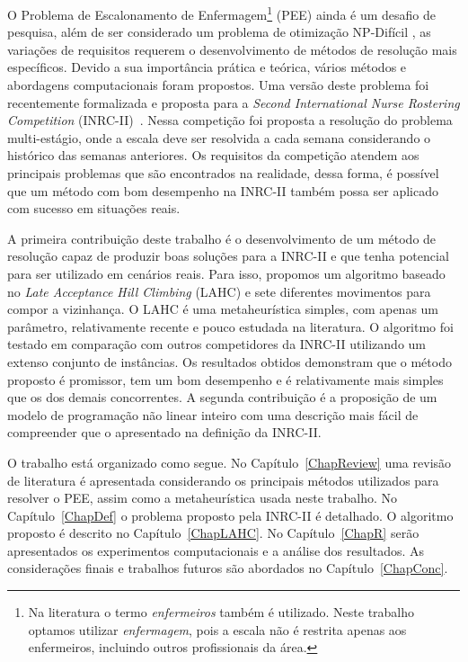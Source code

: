 \documentclass[cic,tc, twoside]{iiufrgs}
\begin{document}
O Problema de Escalonamento de Enfermagem\footnote{Na literatura o termo \emph{enfermeiros} também é utilizado. Neste trabalho optamos utilizar \emph{enfermagem}, pois a escala não é restrita apenas aos enfermeiros, incluindo outros profissionais da área.} (PEE) ainda é um desafio de pesquisa, além de ser considerado um problema de otimização NP-Difícil \cite{osogami2000classification}, as variações de requisitos requerem o desenvolvimento de métodos de resolução mais específicos. Devido a sua importância prática e teórica, vários métodos e abordagens computacionais foram propostos. Uma versão deste problema foi recentemente formalizada e proposta para a \textit{Second International Nurse Rostering Competition} (INRC-II)~\cite{ceschia2015second}. Nessa competição foi proposta a resolução do problema multi-estágio, onde a escala deve ser resolvida a cada semana considerando o histórico das semanas anteriores. Os requisitos da competição atendem aos principais problemas que são encontrados na realidade, dessa forma, é possível que um método com bom desempenho na INRC-II também possa ser aplicado com sucesso em situações reais. 

A primeira contribuição deste trabalho é o desenvolvimento de um método de resolução capaz de produzir boas soluções para a INRC-II e que tenha potencial para ser utilizado em cenários reais. Para isso, propomos um algoritmo baseado no \textit{Late Acceptance Hill Climbing} (LAHC) e sete diferentes movimentos para compor a vizinhança. O LAHC é uma metaheurística simples, com apenas um parâmetro, relativamente recente e pouco estudada na literatura. O algoritmo foi testado em comparação com outros competidores da INRC-II utilizando um extenso conjunto de instâncias. Os resultados obtidos demonstram que o método proposto é promissor, tem um bom desempenho e é relativamente mais simples que os dos demais concorrentes. A segunda contribuição é a proposição de um modelo de programação não linear inteiro com uma descrição mais fácil de compreender que o apresentado na definição da INRC-II.

O trabalho está organizado como segue. No Capítulo~\ref{ChapReview} uma revisão de literatura é apresentada considerando os principais
métodos utilizados para resolver o PEE, assim como a metaheurística usada 
neste trabalho. No Capítulo~\ref{ChapDef} o problema proposto pela INRC-II é detalhado. O algoritmo proposto é descrito no 
Capítulo~\ref{ChapLAHC}. No Capítulo~\ref{ChapR} serão apresentados os experimentos computacionais e a análise dos resultados. 
As considerações finais e trabalhos futuros são abordados no Capítulo~\ref{ChapConc}.
\end{document}
